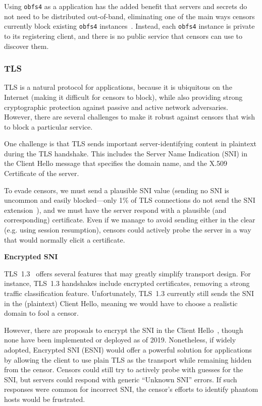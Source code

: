 \documentclass[sigconf]{acmart}
\renewcommand{\paragraph}[1]{\smallskip\noindent\textbf{#1\quad}}
\begin{document}
Using \texttt{obfs4} as a \scheme application has the added benefit that servers
and secrets do not need to be distributed out-of-band, eliminating one of the
main ways censors currently block existing \texttt{obfs4}
instances~\cite{tor-bridge-blocking-blog}. Instead, each \scheme \texttt{obfs4}
instance is private to its registering client, and there is no public service
that censors can use to discover them.



\subsubsection{TLS}

TLS is a natural protocol for \scheme applications, because it is ubiquitous on
the Internet (making it difficult for censors to block), while also providing
strong cryptographic protection against passive and active network adversaries.
However, there are several challenges to make it robust against censors that
wish to block a particular service.

One challenge is that TLS sends important server-identifying content in plaintext
during the TLS handshake. This includes the Server Name Indication (SNI) in the
Client Hello message that specifies the domain name, and the
X.509 Certificate of the server.

To evade censors, we must send a plausible SNI value (sending no SNI is
uncommon and easily blocked---only 1\% of TLS connections
do not send the SNI extension~\cite{tls-fingerprint}), and we must have the server respond with
a plausible (and corresponding) certificate. Even if we manage to avoid sending
either in the clear (e.g. using session resumption), censors could actively probe
the server in a way that would normally elicit a certificate.


\paragraph{Encrypted SNI}
\label{esni}

TLS~1.3~\cite{tls13} offers several features that may greatly simplify 
\scheme transport design. For instance, TLS~1.3 handshakes include encrypted
certificates, removing a strong traffic classification feature.
Unfortunately, TLS~1.3 currently still sends the SNI in the (plaintext) Client
Hello, meaning we would have to choose a realistic domain to fool a censor.

However, there are proposals to encrypt the SNI in the Client Hello~\cite{ietf-tls-esni-02},
though none have been implemented or deployed as of 2019. Nonetheless,
if widely adopted, Encrypted SNI (ESNI) would offer a powerful solution for
\scheme applications by allowing the client to use plain TLS as the transport
while remaining hidden from the censor.
Censors could still try to actively probe with guesses for the SNI,
but servers could respond with generic ``Unknown SNI'' errors. If such responses
were common for incorrect SNI, the censor's efforts to identify phantom hosts
would be frustrated.
\end{document}
